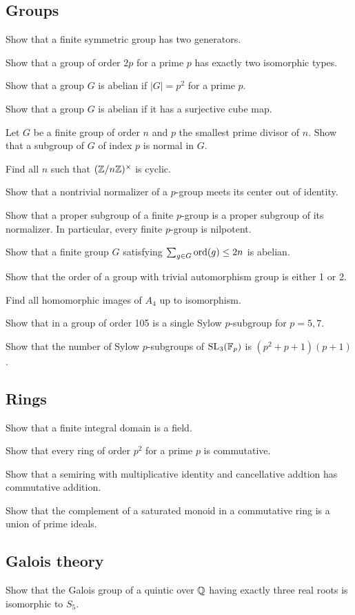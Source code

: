 \documentclass[11pt]{article}
\begin{document}
\subsection*{Groups}
\begin{cond}
\item Show that a finite symmetric group has two generators.
\item Show that a group of order $2p$ for a prime $p$ has exactly two isomorphic types.
\item Show that a group $G$ is abelian if $|G|=p^2$ for a prime $p$.
\item Show that a group $G$ is abelian if it has a surjective cube map.
\item Let $G$ be a finite group of order $n$ and $p$ the smallest prime divisor of $n$. Show that a subgroup of $G$ of index $p$ is normal in $G$.
\item Find all $n$ such that $(\mathbb{Z}/n\mathbb{Z})^\times$ is cyclic.
\item Show that a nontrivial normalizer of a $p$-group meets its center out of identity.
\item Show that a proper subgroup of a finite $p$-group is a proper subgroup of its normalizer. In particular, every finite $p$-group is nilpotent.
\item Show that a finite group $G$ satisfying $\sum_{g\in G}\operatorname{ord}(g)\le2n$ is abelian.
\item Show that the order of a group with trivial automorphism group is either 1 or 2.
\item Find all homomorphic images of $A_4$ up to isomorphism.
\item Show that in a group of order 105 is a single Sylow $p$-subgroup for $p=5,7$.
\item Show that the number of Sylow $p$-subgroups of $\mathrm{SL}_3(\mathbb{F}_p)$ is $(p^2+p+1)(p+1)$.
\end{cond}

\subsection*{Rings}
\begin{cond}
\item Show that a finite integral domain is a field.
\item Show that every ring of order $p^2$ for a prime $p$ is commutative.
\item Show that a semiring with multiplicative identity and cancellative addtion has commutative addition.
\item Show that the complement of a saturated monoid in a commutative ring is a union of prime ideals.
\end{cond}

\subsection*{Galois theory}
\begin{cond}
\item Show that the Galois group of a quintic over $\mathbb{Q}$ having exactly three real roots is isomorphic to $S_5$.
\end{cond}
\end{document}
